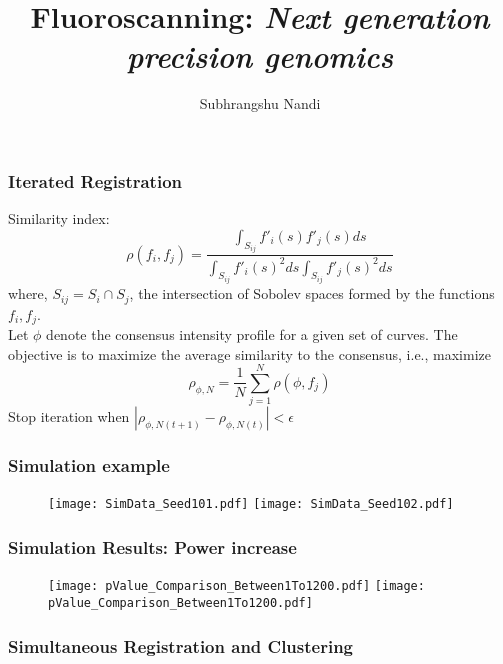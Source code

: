 \documentclass[10pt,dvipsnames,table]{beamer}
\title[Fluoroscanning]{Fluoroscanning: {\emph{Next generation precision genomics}}}
\author{Subhrangshu Nandi}
\begin{document}
\setlength{\baselineskip}{16truept}
\frame{\maketitle}

\begin{frame}
\frametitle{Iterated Registration}
Similarity index:
\[ \rho(f_i, f_j) = \frac{\int _{S_{ij}}f'_i(s)f'_j(s) ds}{\int _{S_{ij}}f'_i(s)^2 ds \int _{S_{ij}}f'_j(s)^2 ds} \]
where, $S_{ij} = S_i \cap S_j$, the intersection of Sobolev spaces formed by the functions $f_i, f_j$.\\

Let $\phi$ denote the consensus intensity profile for a given set of curves. The objective is to maximize the average similarity to the consensus, i.e., maximize
\[ \rho_{\phi, N} = \frac{1}{N} \sum \limits_{j = 1}^{N} \rho(\phi, f_j)\]
Stop iteration when $|\rho_{\phi, N (t+1)} - \rho_{\phi, N (t)} | < \epsilon$
\end{frame}

\begin{frame}
\frametitle{Simulation example}
\begin{figure}
\begin{centering}
\texttt{[image: SimData\_Seed101.pdf]}
\texttt{[image: SimData\_Seed102.pdf]}
\end{centering}
\end{figure}
\end{frame}

\begin{frame}
\frametitle{Simulation Results: Power increase}
\begin{figure}
\begin{centering}
\texttt{[image: pValue\_Comparison\_Between1To1200.pdf]}
\texttt{[image: pValue\_Comparison\_Between1To1200.pdf]}
\end{centering}
\end{figure}
\end{frame}

\begin{frame}
\frametitle{Simultaneous Registration and Clustering}
\begin{enumerate}

\end{enumerate}

\end{frame}
\end{document}
